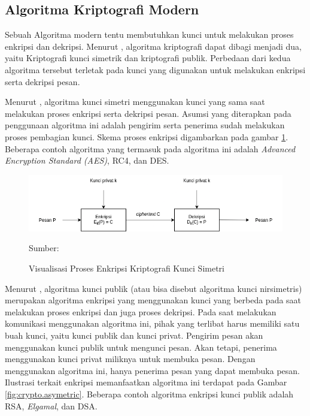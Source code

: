 \subsection{Algoritma Kriptografi Modern}

Sebuah Algoritma modern tentu membutuhkan kunci untuk melakukan proses enkripsi dan dekripsi. Menurut \textcite{schneier1996}, algoritma kriptografi dapat dibagi menjadi dua, yaitu Kriptografi kunci simetrik dan kriptografi publik. Perbedaan dari kedua algoritma tersebut terletak pada kunci yang digunakan untuk melakukan enkripsi serta dekripsi pesan. 

Menurut \textcite{munir2019}, algoritma kunci simetri menggunakan kunci yang sama saat melakukan proses enkripsi serta dekripsi pesan. Asumsi yang diterapkan pada penggunaan algoritma ini adalah pengirim serta penerima sudah melakukan proses pembagian kunci. Skema proses enkripsi digambarkan pada gambar \ref{fig:crypto.symetric}. Beberapa contoh algoritma yang termasuk pada algoritma ini adalah \emph{Advanced Encryption Standard (AES)}, RC4, dan DES.

\begin{figure}[!h]
  \centering
  \includegraphics[width=\textwidth]{chapters/res/chapter-2/img/crypto.symetric.png}
  \caption{Visualisasi Proses Enkripsi Kriptografi Kunci Simetri} \label{fig:crypto.symetric}
  Sumber: \textcite{munir2019}
\end{figure}

Menurut \textcite{munir2019}, algoritma kunci publik (atau bisa disebut algoritma kunci nirsimetris) merupakan algoritma enkripsi yang menggunakan kunci yang berbeda pada saat melakukan proses enkripsi dan juga proses dekripsi. Pada saat melakukan komunikasi menggunakan algoritma ini, pihak yang terlibat harus memiliki satu buah kunci, yaitu kunci publik dan kunci privat. Pengirim pesan akan menggunakan kunci publik untuk mengunci pesan. Akan tetapi, penerima menggunakan kunci privat miliknya untuk membuka pesan. Dengan menggunakan algoritma ini, hanya penerima pesan yang dapat membuka pesan. Ilustrasi terkait enkripsi memanfaatkan algoritma ini terdapat pada Gambar \ref{fig:crypto.asymetric}. Beberapa contoh algoritma enkripsi kunci publik adalah RSA, \emph{Elgamal}, dan DSA.

